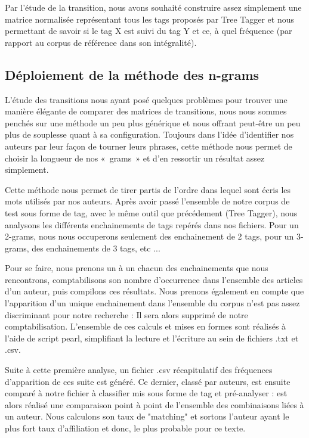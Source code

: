 \documentclass[a4paper]{article}
\begin{document}
Par l'étude de la transition, nous avons souhaité construire assez simplement une matrice normalisée représentant tous les tags proposés par Tree Tagger et nous permettant de savoir si le tag X est suivi du tag Y et ce, à quel fréquence (par rapport au corpus de référence dans son intégralité).


\subsection{Déploiement de la méthode des n-grams}

L'étude des transitions nous ayant posé quelques problèmes pour trouver une manière élégante de comparer des matrices de transitions, nous nous sommes penchés sur une méthode un peu plus générique et nous offrant peut-être un peu plus de souplesse quant à sa configuration. Toujours dans l'idée d'identifier nos auteurs par leur façon de tourner leurs phrases, cette méthode nous permet de choisir la longueur de nos «~grams~» et d'en ressortir un résultat assez simplement.

Cette méthode nous permet de tirer partis de l'ordre dans lequel sont écris les mots utilisés par nos auteurs. Après avoir passé l'ensemble de notre corpus de test sous forme de tag, avec le même outil que précédement (Tree Tagger), nous analysons les différents enchainements de tags repérés dans nos fichiers. Pour un 2-grams, nous nous occuperons seulement des enchainement de 2 tags, pour un 3-grams, des enchainements de 3 tags, etc ...

Pour se faire, nous prenons un à un chacun des enchainements que nous rencontrons, comptabilisons son nombre d'occurrence dans l'ensemble des articles d'un auteur, puis compilons ces résultats. Nous prenons également en compte que l'apparition d'un unique enchainement dans l'ensemble du corpus n'est pas assez discriminant pour notre recherche : Il sera alors supprimé de notre comptabilisation. L'ensemble de ces calculs et mises en formes sont réalisés à l'aide de script pearl, simplifiant la lecture et l'écriture au sein de fichiers .txt et .csv.

Suite à cette première analyse, un fichier .csv récapitulatif des fréquences d'apparition de ces suite est généré. Ce dernier, classé par auteurs, est ensuite comparé à notre fichier à classifier mis sous forme de tag et pré-analyser : est alors réalisé une comparaison point à point de l'ensemble des combinaisons liées à un auteur. Nous calculons son taux de "matching" et sortons l'auteur ayant le plus fort taux d'affiliation et donc, le plus probable pour ce texte. 
\end{document}

